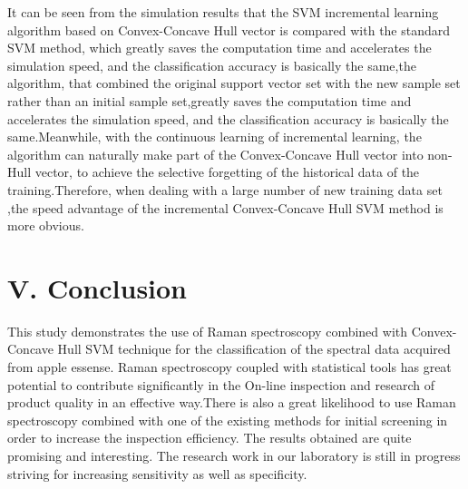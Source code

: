 \documentclass[a4paper]{article}
\begin{document}
It can be seen from the simulation results that the SVM incremental learning algorithm based on Convex-Concave Hull vector is compared with the standard SVM method, which greatly saves the computation time and accelerates the simulation speed, and the classification accuracy is basically the same,the algorithm, that combined the original support vector set with the new sample set rather than an initial sample set,greatly saves the computation time and accelerates the simulation speed, and the classification accuracy is basically the same.Meanwhile, with the continuous learning of incremental learning, the algorithm can naturally make part of the Convex-Concave Hull vector into non-Hull vector, to achieve the selective forgetting of the historical data of the training.Therefore, when dealing with a large number of new training data set ,the speed advantage of the incremental Convex-Concave Hull SVM method is more obvious.

\section{V.	Conclusion}
This  study  demonstrates  the  use  of  Raman  spectroscopy  combined  with Convex-Concave Hull SVM  technique  for the  classification  of  the  spectral  data  acquired  from  apple essense. Raman  spectroscopy  coupled  with  statistical  tools  has  great  potential  to  contribute significantly in the On-line inspection and research of product quality in an effective way.There is also a great  likelihood  to  use  Raman  spectroscopy  combined  with  one  of  the  existing  methods  for initial screening in order to increase the inspection efficiency. The results obtained are quite promising and interesting. The research work in our laboratory is still in progress striving for increasing sensitivity as well as specificity.
\end{document}
